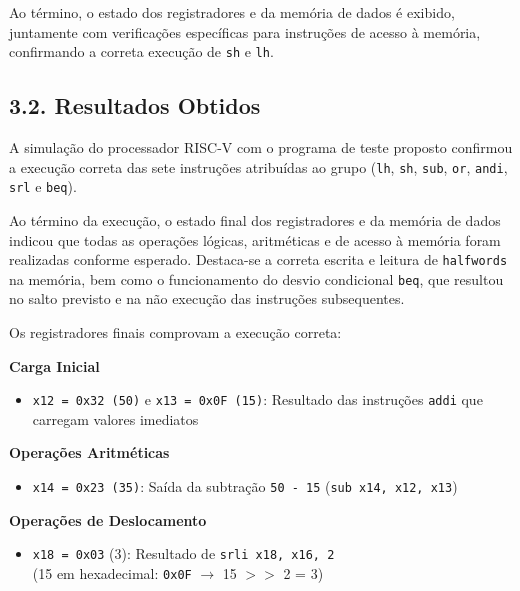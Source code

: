 \documentclass[12pt, a4paper]{article}
\begin{document}
Ao término, o estado dos registradores e da memória de dados é exibido, juntamente com verificações específicas para instruções de acesso à memória, confirmando a correta execução de \texttt{sh} e \texttt{lh}.

\subsection*{3.2. Resultados Obtidos}

A simulação do processador RISC-V com o programa de teste proposto confirmou a execução correta das sete instruções atribuídas ao grupo (\texttt{lh}, \texttt{sh}, \texttt{sub}, \texttt{or}, \texttt{andi}, \texttt{srl} e \texttt{beq}). 

Ao término da execução, o estado final dos registradores e da memória de dados indicou que todas as operações lógicas, aritméticas e de acesso à memória foram realizadas conforme esperado. Destaca-se a correta escrita e leitura de \texttt{halfwords} na memória, bem como o funcionamento do desvio condicional \texttt{beq}, que resultou no salto previsto e na não execução das instruções subsequentes.

Os registradores finais comprovam a execução correta:
\vspace{0.3cm}

\noindent\textbf{Carga Inicial}
\begin{itemize}
    \item \texttt{x12 = 0x32 (50)} e \texttt{x13 = 0x0F (15)}: Resultado das instruções \texttt{addi} que carregam valores imediatos
\end{itemize}

\vspace{0.3cm} %

\noindent\textbf{Operações Aritméticas}
\begin{itemize}
    \item \texttt{x14 = 0x23 (35)}: Saída da subtração \texttt{50 - 15} (\texttt{sub x14, x12, x13})
\end{itemize}

\vspace{0.3cm}

\noindent\textbf{Operações de Deslocamento}
\begin{itemize}
    \item \texttt{x18 = 0x03} (3): Resultado de \texttt{srli x18, x16, 2} \\
    (15 em hexadecimal: \texttt{0x0F} $\rightarrow$ 15 $>>$ 2 = 3) \\
\end{itemize}
\end{document}
